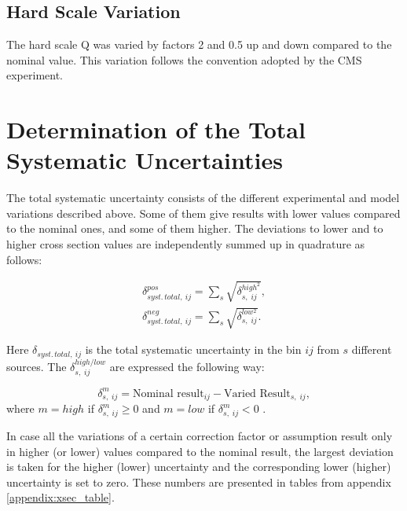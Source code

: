 \subsection{Hard Scale Variation}

The hard scale Q was varied by factors
2 and 0.5 up and down compared to the nominal value. This variation follows the convention 
adopted by the CMS experiment.

\section{Determination of the Total Systematic Uncertainties}\label{sec:syst_det}

The total systematic uncertainty consists of the different experimental and model variations described above.
Some of them give results with lower values compared to the nominal ones, and some of them higher.
The deviations to lower and to higher cross section values are independently summed up in quadrature as follows:

\begin{align}
 \delta_{syst.\,total,\:ij}^{pos} = \sum_{s}\sqrt{\delta_{s,\;ij}^{high^{2}}}, \\
 \delta_{syst.\,total,\:ij}^{neg} = \sum_{s} \sqrt{\delta_{s,\;ij}^{low^{2}}}.
\end{align}

Here $\delta_{syst.\,total,\:ij}$ is the total systematic uncertainty in the bin $ij$ from
$s$ different sources. The $\delta_{s,\;ij}^{high/low}$ are expressed the following way:

\begin{equation}
 \delta_{s,\;ij}^{m} = \textrm{Nominal result}_{ij} - \textrm{Varied Result}_{s,\;ij}, 
\end{equation}
where $m = high$ if $\delta_{s,\;ij}^{m} \geq 0$ and $m = low$ if $\delta_{s,\;ij}^{m} < 0$ . 

In case all the variations of a certain correction factor or assumption result only in higher (or lower) values 
compared to the nominal result, the largest deviation is taken for the higher (lower) uncertainty and the corresponding 
lower (higher) uncertainty is set to zero. These numbers are presented
in tables from appendix \ref{appendix:xsec_table}.

% 

